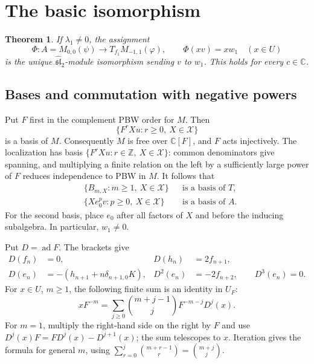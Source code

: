 \documentclass[11pt]{article}
\newcommand{\C}{\mathbb C}
\newcommand{\Z}{\mathbb Z}
\newcommand{\g}{\widehat{\mathfrak{sl}}_2}
\newcommand{\ad}{\operatorname{ad}}
\newtheorem{theorem}{Theorem}
\begin{document}
\section{The basic isomorphism}

\begin{theorem}\label{thm:basic}
If \(\lambda_1\ne0\), the assignment
\[
 \Phi:A=M_{0,0}(\psi)\longrightarrow T_{f_1}M_{-1,1}(\varphi),
 \qquad \Phi(xv)=xw_1\quad(x\in U)
\]
is the unique \(\g\)-module isomorphism sending \(v\) to \(w_1\).
This holds for every \(c\in\C\).
\end{theorem}

\subsection{Bases and commutation with negative powers}

Put \(F\) first in the complement PBW order for \(M\). Then
\[
 \{F^rXu:r\ge0,\ X\in\mathcal X\}
\]
is a basis of \(M\). Consequently \(M\) is free over \(\C[F]\), and \(F\)
acts injectively.
The localization has basis \(\{F^rXu:r\in\Z,\ X\in\mathcal X\}\):
common denominators give spanning, and multiplying a finite relation on
the left by a sufficiently large power of \(F\) reduces independence to PBW in \(M\).
It follows that
\begin{equation}\label{eq:bases}
\begin{aligned}
 &\{B_{m,X}:m\ge1,\ X\in\mathcal X\}&&\text{is a basis of }T,\\
 &\{Xe_0^pv:p\ge0,\ X\in\mathcal X\}&&\text{is a basis of }A.
\end{aligned}
\end{equation}
For the second basis, place \(e_0\) after all factors of \(X\) and before
the inducing subalgebra. In particular, \(w_1\ne0\).

Put \(D=\ad F\). The brackets give
\begin{equation}\label{eq:ad}
\begin{aligned}
 D(f_n)&=0,& D(h_n)&=2f_{n+1},\\
 D(e_n)&=-(h_{n+1}+n\delta_{n+1,0}K),&
 D^2(e_n)&=-2f_{n+2},\qquad D^3(e_n)=0.
\end{aligned}
\end{equation}
For \(x\in U\), \(m\ge1\), the following finite sum is an identity in \(U_F\):
\begin{equation}\label{eq:commute}
 xF^{-m}=\sum_{j\ge0}\binom{m+j-1}{j}F^{-m-j}D^j(x).
\end{equation}
For \(m=1\), multiply the right-hand side on the right by \(F\) and use
\(D^j(x)F=FD^j(x)-D^{j+1}(x)\); the sum telescopes to \(x\).
Iteration gives the formula for general \(m\), using
\(\sum_{r=0}^j\binom{m+r-1}{r}=\binom{m+j}{j}\).
\end{document}

